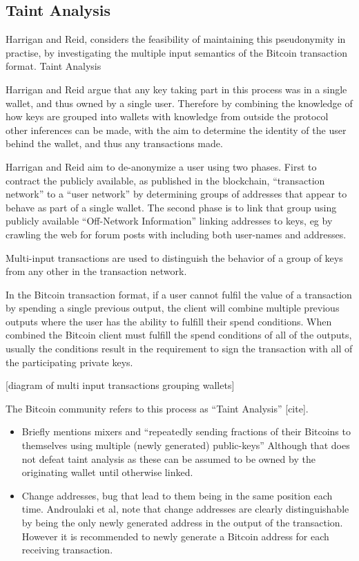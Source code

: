 \subsection{Taint Analysis}
Harrigan and Reid, considers the feasibility of maintaining this pseudonymity in practise, by investigating the multiple input semantics of the Bitcoin transaction format.
Taint Analysis

Harrigan and Reid argue that any key taking part in this process was in a single wallet, and thus owned by a single user. Therefore by combining the knowledge of how keys are grouped into wallets with knowledge from outside the protocol other inferences can be made, with the aim to determine the identity of the user behind the wallet, and thus any transactions made.

Harrigan and Reid aim to de-anonymize a user using two phases.  First to contract the publicly available, as published in the blockchain, “transaction network” to a “user network” by determining groups of addresses that appear to behave as part of a single wallet.  The second phase is to  link that group using publicly available “Off-Network Information” linking addresses to keys, eg by crawling the web for forum posts with including both user-names and addresses.

Multi-input transactions are used to distinguish the behavior of a group of keys from any other in the transaction network.

In the Bitcoin transaction format, if a user cannot fulfil the value of a transaction by spending a single previous output, the client will combine multiple previous outputs where the user has the ability to fulfill their spend conditions.  When combined the Bitcoin client must fulfill the spend conditions of all of the outputs, usually the conditions result in the requirement to sign the transaction with all of the participating private keys.

[diagram of multi input transactions grouping wallets]

The Bitcoin community refers to this process as “Taint Analysis” [cite].

\begin{itemize}
    \item Briefly mentions mixers and “repeatedly sending fractions of their Bitcoins to themselves using multiple (newly generated) public-keys” Although that does not defeat taint analysis as these can be assumed to be owned by the originating wallet until otherwise linked.
    \item Change addresses, bug that lead to them being in the same position each time. Androulaki et al, note that change addresses are clearly distinguishable by being the only newly generated address in the output of the transaction. However it is recommended to newly generate a Bitcoin address for each receiving transaction.
\end{itemize}

